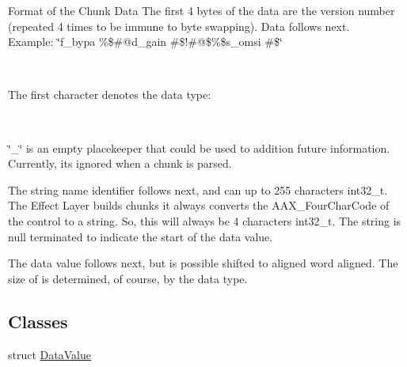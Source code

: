 \begin{DoxyParagraph}{Format of the Chunk Data}
The first 4 bytes of the data are the version number (repeated 4 times to be immune to byte swapping). Data follows next.~\newline
 ~\newline
Example\+: \char`\"{}f\+\_\+bypa \%\$\#@d\+\_\+gain \#\$!\#@\$\%\$s\+\_\+omsi \#\$\char`\"{} 
\begin{DoxyCode}{0}
\DoxyCodeLine{----------------------------}
\end{DoxyCode}
 ~\newline
\begin{DoxyItemize}
\item The first character denotes the data type\+: 
\begin{DoxyCode}{0}
\DoxyCodeLine{\textcolor{charliteral}{'f'} = \textcolor{keywordtype}{float}}
\DoxyCodeLine{\textcolor{charliteral}{'d'} = \textcolor{keywordtype}{double}}
\end{DoxyCode}
 ~\newline
\item \char`\"{}\+\_\+\char`\"{} is an empty placekeeper that could be used to addition future information. Currently, it\textquotesingle{}s ignored when a chunk is parsed.\end{DoxyItemize}
\begin{DoxyItemize}
\item The string name identifier follows next, and can up to 255 characters int32\+\_\+t. The Effect Layer builds chunks it always converts the A\+A\+X\+\_\+\+Four\+Char\+Code of the control to a string. So, this will always be 4 characters int32\+\_\+t. The string is null terminated to indicate the start of the data value.\end{DoxyItemize}
\begin{DoxyItemize}
\item The data value follows next, but is possible shifted to aligned word aligned. The size of is determined, of course, by the data type. \end{DoxyItemize}

\end{DoxyParagraph}
\subsection*{Classes}
\begin{DoxyCompactItemize}
\item 
struct \mbox{\hyperlink{a01465}{Data\+Value}}
\end{DoxyCompactItemize}
